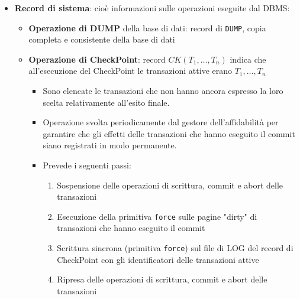 \documentclass[a4paper,twoside]{article}
\begin{document}
\begin{itemize}
\begin{itemize}
      \item \textbf{REDO}: per rifare un’azione su un oggetto \( O \) è sufficiente
        ricopiare in \( O \) il valore \( AS \); l’insert/delete viene rifatto
        inserendo/cancellando \( O \)
    \end{itemize}
    Gli inserimenti controllano sempre l'esistenza dell'oggetto \( O \) prima di eseguire
    l'operazione, quindi non vengono inseriti i duplicati

    Per queste operazioni vale la \textbf{proprietà di idempotenza}, cioè:
    \[
      \begin{aligned}
        UNDO(UNDO(A)) &= UNDO(A) \\
        REDO(REDO(A)) &= REDO(A)
      \end{aligned}
    \] 

  \item \textbf{Record di sistema}: cioè informazioni sulle operazioni eseguite dal
    DBMS:
    \begin{itemize}
      \item \textbf{Operazione di DUMP} della base di dati: record di \texttt{DUMP}, copia
      completa e consistente della base di dati

      \item \textbf{Operazione di CheckPoint}: record \( CK(T_1, \ldots, T_n) \)
        indica che all'esecuzione del CheckPoint le transazioni attive erano
        \( T_1, \ldots, T_n \) 
        \begin{itemize}
          \item Sono elencate le transazioni che non hanno ancora espresso la loro
            scelta relativamente all'esito finale.

          \item Operazione svolta periodicamente dal gestore dell'affidabilità per
            garantire che gli effetti delle transazioni che hanno eseguito il commit
            siano registrati in modo permanente.

          \item Prevede i seguenti passi:
            \begin{enumerate}
              \item Sospensione delle operazioni di scrittura, commit e abort delle
                transazioni

              \item Esecuzione della primitiva \texttt{force} sulle pagine "dirty" di
                transazioni che hanno eseguito il commit

              \item Scrittura sincrona (primitiva \texttt{force}) sul file di LOG del
                record di CheckPoint con gli identificatori delle transazioni attive

              \item Ripresa delle operazioni di scrittura, commit e abort delle transazioni
            \end{enumerate}
        \end{itemize}
    \end{itemize}
\end{itemize}
\end{document}
